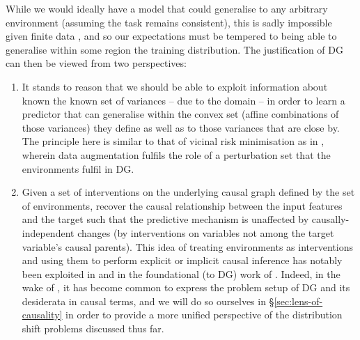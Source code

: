 %
While we would ideally have a model that could generalise to any arbitrary environment (assuming
the task remains consistent), this is sadly impossible given finite data
\citep{david2010impossibility}, and so our expectations must be tempered to being able to generalise
within some region the training distribution.
%
The justification of DG can then be viewed from two perspectives:
\begin{enumerate}
%
    \item 
%
        It stands to reason that we should be able to exploit information about known the known set
        of variances -- due to the domain -- in order to learn a predictor that can generalise
        within the convex set (affine combinations of those variances) they define as well as to
        those variances that are close by.
%
        The principle here is similar to that of vicinal risk minimisation
        \citep{chapelle2000vicinal} as in \cite{zhang2017mixup}, wherein data augmentation fulfils
        the role of a perturbation set that the environments fulfil in DG.
%
    \item
        Given a set of interventions on the underlying causal graph defined by the set of
        environments, recover the causal relationship between the input features and the target
        such that the predictive mechanism is unaffected by causally-independent changes (by
        interventions on variables not among the target variable's causal parents).
%
        This idea of treating environments as interventions and using them to perform explicit or
        implicit causal inference has notably been exploited in \cite{peters2016causal} and in the
        foundational (to DG) work of \cite{arjovsky2019invariant}.
%
        Indeed, in the wake of \cite{arjovsky2019invariant}, it has become common \citep{
        gulrajani2020search, krueger2021out, mahajan2021domain, lin2022zin} to express the problem
        setup of DG and its desiderata in causal terms, and we will do so ourselves in
        \S\ref{sec:lens-of-causality} in order to provide a more unified perspective of the
        distribution shift problems discussed thus far.
%
\end{enumerate}

